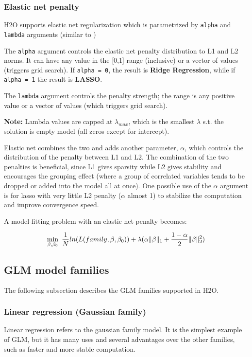\subsubsection{Elastic net penalty}

H2O supports elastic net regularization which is parametrized by \texttt{alpha} and \texttt{lambda} arguments
(similar to )

The \texttt{alpha} argument controls the elastic net penalty distribution to L1 and L2 norms. It can have any value
in the [0,1] range (inclusive) or a vector of values (triggers grid search). If \texttt{alpha = 0}, the result
is \textbf{Ridge Regression}, while if \texttt{alpha = 1} the result is \textbf{LASSO}.

The \texttt{lambda} argument controls the penalty strength; the range is any positive value or a vector of values
(which triggers grid search).

\textbf{Note:} Lambda values are capped at $\lambda_{max}$, which is the smallest $\lambda$ s.t. the solution is
empty model (all zeros except for intercept).

Elastic net combines the two and adds another parameter, $\alpha$, which controls the distribution of the penalty
between L1 and L2. The combination of the two penalties is beneficial, since L1 gives sparsity while L2 gives
stability and encourages the grouping effect (where a group of correlated variables tends to be dropped or added
into the model all at once). One possible use of the $\alpha$ argument is for lasso with very little L2 penalty
($\alpha$ almost 1) to stabilize the computation and improve convergence speed.

A model-fitting problem with an elastic net penalty becomes:

\[ \min\limits_{\beta,\beta_0}\ {{1\over{N}} ln(L(family,\beta,\beta_0))  + \lambda (\alpha \| \beta \|_1}  + {1- \alpha \over 2} \| \beta \|_2^2) \]

\subsection{GLM model families}
The following subsection describes the GLM families supported in H2O. 

\subsubsection{Linear regression (Gaussian family)}
Linear regression refers to the gaussian family model. It is the simplest example of GLM, but it has many uses and
several advantages over the other families, such as faster and more stable computation.

